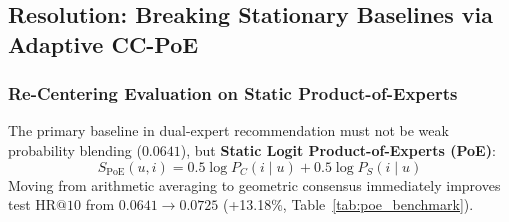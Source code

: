 \subsection{Resolution: Breaking Stationary Baselines via Adaptive CC-PoE}
\label{sec:cc_poe}

\subsubsection{Re-Centering Evaluation on Static Product-of-Experts}
The primary baseline in dual-expert recommendation must not be weak probability blending ($0.0641$), but \textbf{Static Logit Product-of-Experts (PoE)}:
\begin{equation}
    S_{\text{PoE}}(u, i) = 0.5 \log P_C(i \mid u) + 0.5 \log P_S(i \mid u)
\end{equation}
Moving from arithmetic averaging to geometric consensus immediately improves test $\text{HR@10}$ from $0.0641 \to 0.0725$ (+13.18\%, Table~\ref{tab:poe_benchmark}).

